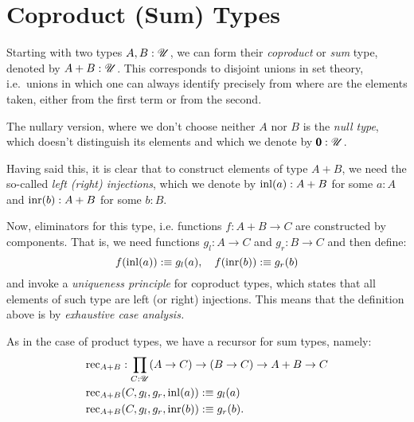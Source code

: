 \section{Coproduct (Sum) Types}

Starting with two types $ A, B : \mathscr{U} $, we can form their \emph{coproduct}
or \emph{sum} type, denoted by $ A + B : \mathscr{U} $. This corresponds to disjoint
unions in set theory, i.e.\ unions in which one can always identify precisely
from where are the elements taken, either from the first term or from the second\footnotemark.

The nullary version, where we don't choose neither $ A $ nor $ B $ is the
\emph{null type}, which doesn't distinguish its elements and which we denote
by $ \pmb{0} : \mathscr{U} $.

Having said this, it is clear that to construct elements of type $ A + B $,
we need the so-called \emph{left (right) injections}, which we denote by
$ \mathrm{inl}(a) : A + B $ for some $ a : A $ and $ \mathrm{inr}(b) : A + B $
for some $ b : B $.

Now, eliminators for this type, i.e. functions $ f : A + B \to C $ are
constructed by components. That is, we need functions $ g_l : A \to C $
and $ g_r : B \to C $ and then define:
\[
  f(\mathrm{inl}(a)) :\equiv g_l(a), \quad
  f(\mathrm{inr}(b)) :\equiv g_r(b)
\]
and invoke a \emph{uniqueness principle} for coproduct types, which states
that all elements of such type are left (or right) injections. This means
that the definition above is by \emph{exhaustive case analysis.}

As in the case of product types, we have a recursor for sum types,
namely:
\begin{align*}
  &\mathrm{rec}_{A + B} : \prod_{C : \mathscr{U}} (A \to C) \to (B \to C) \to A + B \to C \\
  &\mathrm{rec}_{A + B} (C, g_l, g_r, \mathrm{inl}(a)) :\equiv g_l(a) \\
  &\mathrm{rec}_{A + B} (C, g_l, g_r, \mathrm{inr}(b)) :\equiv g_r(b).
\end{align*}

